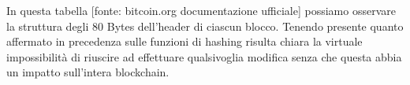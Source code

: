 \begin{table}[ht]
	\centering
\end{table}





In questa tabella [fonte: bitcoin.org documentazione ufficiale] possiamo osservare la struttura degli 80 Bytes dell’header di ciascun blocco. Tenendo presente quanto affermato in precedenza sulle funzioni di hashing risulta chiara la virtuale impossibilità di riuscire ad effettuare qualsivoglia modifica senza che questa abbia un impatto sull’intera blockchain.



